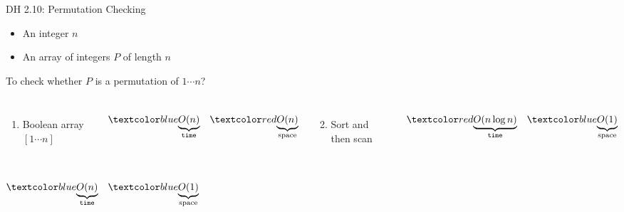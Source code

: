 \begin{frame}{}
  \begin{exampleblock}{DH 2.10: Permutation Checking}
    \begin{itemize}
      \item An integer $n$
      \item An array of integers $P$ of length $n$
    \end{itemize}
    To check whether $P$ is a permutation of $1 \cdots n$?
  \end{exampleblock}

  \begin{columns}[t]
    \pause
      \begin{enumerate}
	\item Boolean array $[1 \cdots n]$
      \end{enumerate}

      \pause
      \[
	\blue{\underbrace{O(n)}_{\texttt{time}}} \quad \red{\underbrace{O(n)}_{\text{space}}}
      \]
    \pause
      \begin{enumerate}
	\setcounter{enumi}{1}
	\item Sort and then scan
      \end{enumerate}

      \pause
      \[
	\red{\underbrace{O(n \log n)}_{\texttt{time}}} \quad \blue{\underbrace{O(1)}_{\text{space}}}
      \]
  \end{columns}

  \pause
  \begin{columns}
      \[
	\blue{\underbrace{O(n)}_{\texttt{time}}} \quad \blue{\underbrace{O(1)}_{\text{space}}}
      \]
    \pause
  \end{columns}
\end{frame}
